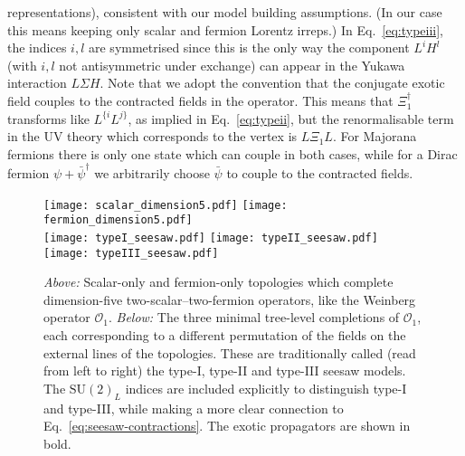 representations), consistent with our model building assumptions. (In our case
this means keeping only scalar and fermion Lorentz irreps.) In
Eq.~\eqref{eq:typeiii}, the indices $i,l$ are symmetrised since this is the only
way the component $L^{i}H^{l}$ (with $i,l$ not antisymmetric under exchange) can
appear in the Yukawa interaction $L \Sigma H$. Note that we adopt the convention
that the conjugate exotic field couples to the contracted fields in the
operator. This means that $\Xi_{1}^{\dagger}$ transforms like $L^{\{i} L^{j\}}$,
as implied in Eq.~\eqref{eq:typeii}, but the renormalisable term in the UV
theory which corresponds to the vertex is $L\Xi_{1}L$. For Majorana fermions
there is only one state which can couple in both cases, while for a Dirac
fermion $\psi + \bar{\psi}^{\dagger}$ we arbitrarily choose $\bar{\psi}$ to
couple to the contracted fields.

\begin{figure}[t]
  \centering
  \texttt{[image: scalar\_dimension5.pdf]}
  \texttt{[image: fermion\_dimension5.pdf]}\\
  \texttt{[image: typeI\_seesaw.pdf]}
  \texttt{[image: typeII\_seesaw.pdf]}
  \texttt{[image: typeIII\_seesaw.pdf]}
  \caption[\textit{Above:} Scalar-only and fermion-only topologies which
  complete dimension-five two-scalar--two-fermion operators, like the Weinberg
  operator $\mathcal{O}_{1}$. \textit{Below:} The three minimal tree-level
  completions of $\mathcal{O}_{1}$, each corresponding to a different
  permutation of the fields on the external lines of the
  topologies.]{\textit{Above:} Scalar-only and fermion-only topologies which
    complete dimension-five two-scalar--two-fermion operators, like the Weinberg
    operator $\mathcal{O}_{1}$. \textit{Below:} The three minimal tree-level
    completions of $\mathcal{O}_{1}$, each corresponding to a different
    permutation of the fields on the external lines of the topologies. These are
    traditionally called (read from left to right) the type-I, type-II and
    type-III seesaw models. The $\mathrm{SU}(2)_{L}$ indices are included
    explicitly to distinguish type-I and type-III, while making a more clear
    connection to Eq.~\eqref{eq:seesaw-contractions}. The exotic propagators are
    shown in bold.}
  \label{fig:seesaw-figs}
\end{figure}

